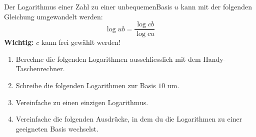 \documentclass[11pt,oneside]{article}
\begin{document}
	\begin{satz}[Basiswechselsatz]\label{satz:Basiswechsel}
		Der Logarithmus einer Zahl zu einer \flqq unbequemen\frqq\:Basis $u$ kann mit der folgenden Gleichung umgewandelt werden: \[\log{u}{b}=\frac{\log{c}{b}}{\log{c}{u}}\]
		\textbf{Wichtig: }$c$ kann frei gewählt werden!
	\end{satz}
	\begin{aufgabe}
		\begin{enumerate}
			\item Berechne die folgenden Logarithmen ausschliesslich mit dem Handy-Taschenrechner.
			\item Schreibe die folgenden Logarithmen zur Basis $10$ um.
			\item Vereinfache zu einen einzigen Logarithmus.
			\item Vereinfache die folgenden Ausdrücke, in dem du die Logarithmen zu einer geeigneten Basis wechselst.

\end{enumerate}
\end{aufgabe}
\end{document}
